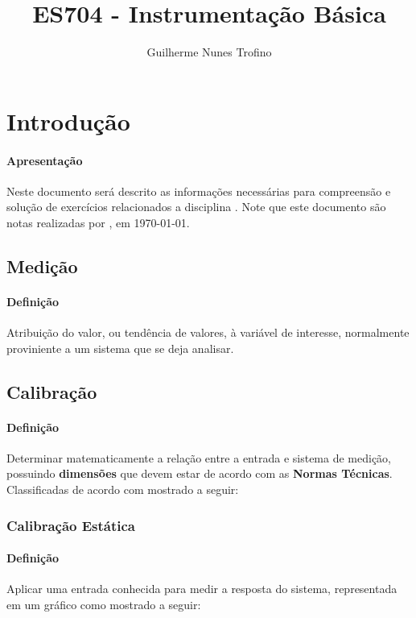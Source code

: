 \documentclass{article}
\title{ES704 - Instrumentação Básica}
\author{Guilherme Nunes Trofino}
\begin{document}
    \maketitle
\newpage

    \tableofcontents
\newpage

    \section{Introdução}
        \paragraph{Apresentação}Neste documento será descrito as informações necessárias para compreensão e solução de exercícios relacionados a disciplina \thetitle. Note que este documento são notas realizadas por \theauthor, em \today.

    \subsection{Medição}
        \paragraph{Definição}Atribuição do valor, ou tendência de valores, à variável de interesse, normalmente proviniente a um sistema que se deja analisar.

    \subsection{Calibração}
        \paragraph{Definição}Determinar matematicamente a relação entre a entrada e sistema de medição, possuindo \textbf{dimensões} que devem estar de acordo com as \textbf{Normas Técnicas}. Classificadas de acordo com mostrado a seguir:

        \subsubsection{Calibração Estática}
            \paragraph{Definição}Aplicar uma entrada conhecida para medir a resposta do sistema, representada em um gráfico como mostrado a seguir:
\end{document}
